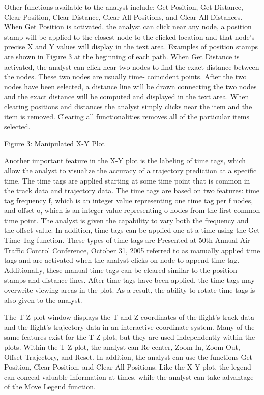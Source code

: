 \documentclass[]{article}
\begin{document}
Other functions available to the analyst include: Get Position, Get Distance, Clear Position, Clear Distance, Clear All Positions, and Clear All Distances. When Get Position is activated, the analyst can click near any node, a position stamp will be applied to the closest node to the clicked location and that node’s precise X and Y values will display in the text area. Examples of position stamps are shown in Figure 3 at the beginning of each path. When Get Distance is activated, the analyst can click near two nodes to find the exact distance between the nodes. These two nodes are usually time- coincident points. After the two nodes have been selected, a distance line will be drawn connecting the two nodes and the exact distance will be computed and displayed in the text area. When clearing positions and distances the analyst simply clicks near the item and the item is removed. Clearing all functionalities removes all of the particular items selected.

Figure 3: Manipulated X-Y Plot

Another important feature in the X-Y plot is the labeling of time tags, which allow the analyst to visualize the accuracy of a trajectory prediction at a specific time. The time tags are applied starting at some time point that is common in the track data and trajectory data. The time tags are based on two features: time tag frequency f, which is an integer value representing one time tag per f nodes, and offset o, which is an integer value representing o nodes from the first common time point. The analyst is given the capability to vary both the frequency and the offset value. In addition, time tags can be applied one at a time using the Get Time Tag function. These types of time tags are Presented at 50th Annual Air Traffic Control Conference, October 31, 2005 referred to as manually applied time tags and are activated when the analyst clicks on node to append time tag. Additionally, these manual time tags can be cleared similar to the position stamps and distance lines. After time tags have been applied, the time tags may overwrite viewing areas in the plot. As a result, the ability to rotate time tags is also given to the analyst.

The T-Z plot window displays the T and Z coordinates of the flight’s track data and the flight’s trajectory data in an interactive coordinate system. Many of the same features exist for the T-Z plot, but they are used independently within the plots. Within the T-Z plot, the analyst can Re-center, Zoom In, Zoom Out, Offset Trajectory, and Reset. In addition, the analyst can use the functions Get Position, Clear Position, and Clear All Positions. Like the X-Y plot, the legend can conceal valuable information at times, while the analyst can take advantage of the Move Legend function.
\end{document}
